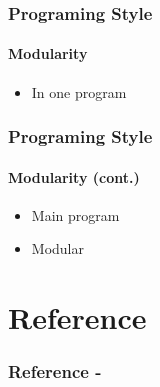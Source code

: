 \documentclass[13pt]{beamer}
\begin{document}
\begin{frame}[t]\frametitle{Programing Style}\framesubtitle{Modularity}
\begin{itemize}
	\item In one program
\end{itemize}
 
\end{frame}

\begin{frame}[t]\frametitle{Programing Style}\framesubtitle{Modularity (cont.)}
\begin{itemize}
	\item Main program
\end{itemize}
 
\begin{itemize}
	\item Modular
\end{itemize}
 

\end{frame}


\section*{Reference}
\begin{frame}[allowframebreaks]

	\frametitle{Reference -}
	
	
	\nocite{*}
\end{frame}
\end{document}
